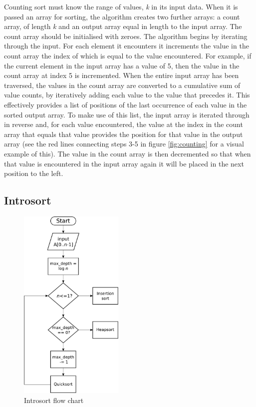 \documentclass[12pt, a4paper]{article}
\begin{document}
Counting sort must know the range of values, \emph{k} in its input data. When it is passed an array for sorting, the algorithm creates two further arrays: a count array, of length \emph{k} and an output array equal in length to the input array. The count array should be initialised with zeroes. The algorithm begins by iterating through the input. For each element it encounters it increments the value in the count array the index of which is equal to the value encountered. For example, if the current element in the input array has a value of 5, then the value in the count array at index 5 is incremented. When the entire input array has been traversed, the values in the count array are converted to a cumulative sum of value counts, by iteratively adding each value to the value that precedes it. This effectively provides a list of positions of the last occurrence of each value in the sorted output array. To make use of this list, the input array is iterated through in reverse and, for each value encountered, the value at the index in the count array that equals that value provides the position for that value in the output array (see the red lines connecting steps 3-5 in figure \ref{fig:counting} for a visual example of this). The value in the count array is then decremented so that when that value is encountered in the input array again it will be placed in the next position to the left.


\newpage
\subsection{Introsort}\label{sec:introsort}

\begin{figure}
    \centering
    \includegraphics[width=5cm]{introsort.pdf}
    \caption{\label{fig:introsort}Introsort flow chart}
\end{figure}
\end{document}
